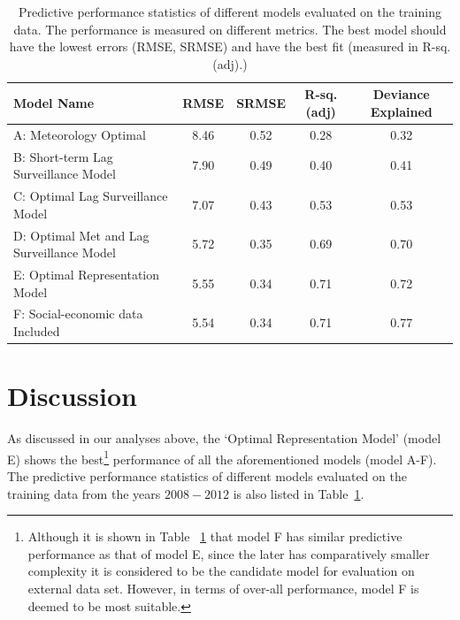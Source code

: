 \documentclass{bmcart}
\begin{document}
\begin{table}
	\centering
	\begin{tabular}{|lcccc|}
		\hline
		\textbf{Model Name} & \textbf{RMSE} & \textbf{SRMSE} & \textbf{R-sq.(adj)} & \textbf{Deviance Explained} \\ 
		\hline
		A: Meteorology Optimal & 8.46 & 0.52 & 0.28 & 0.32 \\ 
		B: Short-term Lag Surveillance Model  & 7.90 & 0.49 & 0.40 & 0.41 \\ 
		C: Optimal Lag Surveillance Model  & 7.07 & 0.43 & 0.53 & 0.53 \\ 
		D: Optimal Met and Lag Surveillance Model  & 5.72 & 0.35 & 0.69 & 0.70 \\ 
		E: Optimal Representation Model & 5.55 & 0.34 & 0.71 & 0.72 \\ 
		F: Social-economic data Included & 5.54 & 0.34 & 0.71 & 0.77 \\ 
		\hline
	\end{tabular}
	\caption{Predictive performance statistics of different models evaluated on the training data. The performance is measured on different metrics. The best model should have the lowest errors (RMSE, SRMSE) and have the best fit (measured in R-sq.(adj).) }
	\label{resultsPrediction}
\end{table}

\section{Discussion} \label{discussion}

As discussed in our analyses above, the `Optimal Representation Model' (model E) shows the best\footnote{Although it is shown in Table ~\ref{resultsPrediction} that model F has similar predictive performance as that of model E, since the later has comparatively smaller complexity it is considered to be the candidate model for evaluation on external data set. However, in terms of over-all performance, model F is deemed to be most suitable.} performance of all the aforementioned models (model A-F). The predictive performance statistics of different models evaluated on the training data from the years $2008-2012$ is also listed in Table~\ref{resultsPrediction}. 
\end{document}

